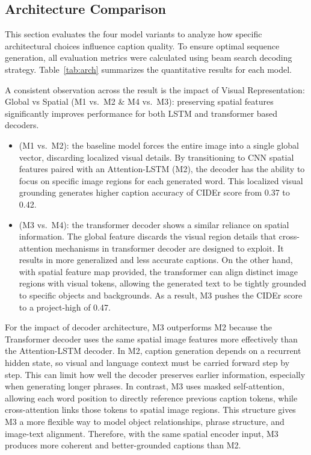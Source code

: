 \documentclass[10pt,twocolumn,letterpaper]{article}
\begin{document}
\subsection{Architecture Comparison}
This section evaluates the four model variants to analyze how
specific architectural choices influence caption quality. To ensure
optimal sequence generation, all evaluation metrics were calculated
using beam search decoding strategy. Table~\ref{tab:arch} summarizes
the quantitative results for each model.

A consistent observation across the result is the impact of Visual
Representation: Global vs Spatial (M1 vs.\ M2 \& M4 vs.\ M3):
preserving spatial features significantly improves performance for
both LSTM and transformer based decoders.
\begin{itemize}
    \item (M1 vs.\ M2): the baseline model forces the entire image
    into a single global vector, discarding localized visual details.
    By transitioning to CNN spatial features paired with an
    Attention-LSTM (M2), the decoder has the ability to focus on
    specific image regions for each generated word. This localized
    visual grounding generates higher caption accuracy of CIDEr score
    from 0.37 to 0.42.
    \item (M3 vs.\ M4): the transformer decoder shows a similar
    reliance on spatial information. The global feature discards the
    visual region details that cross-attention mechanisms in
    transformer decoder are designed to exploit. It results in more
    generalized and less accurate captions. On the other hand, with
    spatial feature map provided, the transformer can align distinct
    image regions with visual tokens, allowing the generated text to
    be tightly grounded to specific objects and backgrounds. As a
    result, M3 pushes the CIDEr score to a project-high of 0.47.
\end{itemize}

For the impact of decoder architecture, M3 outperforms M2 because the
Transformer decoder uses the same spatial image features more
effectively than the Attention-LSTM decoder. In M2, caption
generation depends on a recurrent hidden state, so visual and
language context must be carried forward step by step. This can limit
how well the decoder preserves earlier information, especially when
generating longer phrases. In contrast, M3 uses masked self-attention,
allowing each word position to directly reference previous caption
tokens, while cross-attention links those tokens to spatial image
regions. This structure gives M3 a more flexible way to model object
relationships, phrase structure, and image-text alignment. Therefore,
with the same spatial encoder input, M3 produces more coherent and
better-grounded captions than M2.
\end{document}
